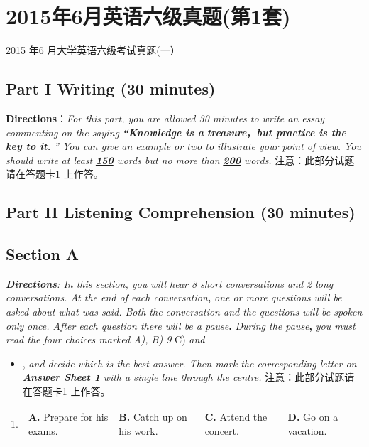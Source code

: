 \documentclass[UTF8,11pt]{ctexart}
\begin{document}
\section*{2015年6月英语六级真题(第1套)}
2015 年6 月大学英语六级考试真题(一）


\subsection*{\textbf{Part I} \textbf{Writing} \textbf{(30 minutes)}}


\textbf{Directions}：\textit{For this part, you are allowed 30 minutes to write an essay commenting on the saying}\textbf{\textit{ “Knowledge is a}} \textbf{\textit{treasure}}，\textbf{\textit{but practice is the key to it.}}\textit{ ” You can give an example or two to illustrate your point of view. You should write} \textit{at least}\textbf{\textit{ }}\textbf{\textit{\uline{150}}}\textit{ words but no more than}\textbf{\textit{ }}\textbf{\textit{\uline{200}}}\textit{ words.} 注意：此部分试题请在答题卡1 上作答。


\subsection*{\textbf{Part} II \textbf{Listening Comprehension} \textbf{(30 minutes)}}


\subsection*{\textbf{Section A}}


\textbf{\textit{Directions}}\textit{: In this section, you will hear 8 short conversations and 2 long conversations. At the end of each conversation}\textbf{,} \textit{one or more questions will be asked about what was said. Both the conversation and the questions will be spoken only} \textit{once. After each question there will be a pause}\textbf{.}\textit{ During the pause}\textbf{,}\textit{ you must read the four choices marked A), B) 9} C)\textit{ and}


\begin{itemize}[leftmargin=2em,itemsep=.2em,topsep=.4em]\item[D.] ,\textit{ and decide which is the best answer. Then mark the corresponding letter on}\textbf{\textit{ Answer Sheet 1}}\textit{ with a single line} \textit{through the centre.} 注意：此部分试题请在答题卡1 上作答。
\end{itemize}

\noindent\begin{tabularx}{\linewidth}{@{}lXXXX@{}}1. & \textbf{A.} Prepare for his exams. & \textbf{B.} Catch up on his work. & \textbf{C.} Attend the concert. & \textbf{D.} Go on a vacation.\\\end{tabularx}\par
\end{document}
